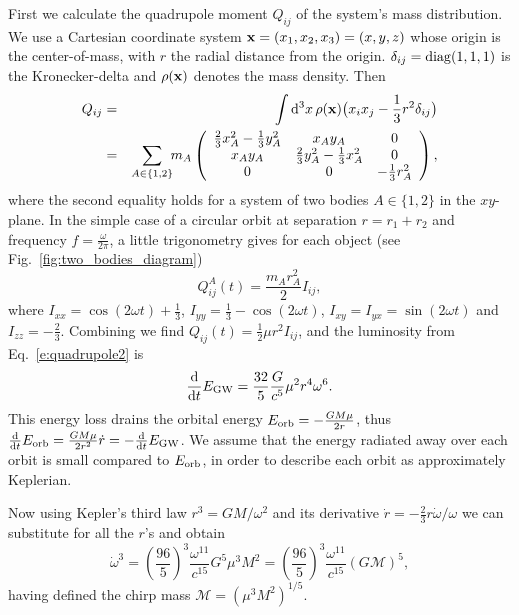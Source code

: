 \documentclass{andp2012}%
\def\w{\omega}
\def\D{{\rm d}}
\def\({\left(}
\def\){\right)}
\def\be{\begin{equation}}
\def\ee{\end{equation}}
\def\bea{\begin{eqnarray}}
\def\eea{\end{eqnarray}}
\newcommand{\refigure}[1]{Fig.~\ref{#1}}
\newcommand{\refeqn}[1]{Eq.\ \ref{#1}}
\def\Mc{\mathcal{M}}
\def\orb{_{\rm orb}}
\begin{document}
First we calculate the quadrupole moment $Q_{ij}$ of the system's
mass distribution.
We use a Cartesian coordinate system ${\bf x}=(x_1, x_2, x_3)=(x,y,z)$
whose origin is the center-of-mass, with $r$ the radial distance from the origin. 
$\delta_{ij} = \rm{diag} (1,1,1)$ is the Kronecker-delta and
$\rho({\bf x})$ denotes the mass density.
Then
\bea
Q_{ij} &=& \int \D^3 x  \, \rho({\bf x})  \bigl( x_i x_j - \frac{1}{3} r^2 \delta_{ij}
\bigr) \\
&=& \sum_{A\in\{1,2\}} \!\! m_A
\(
\begin{array}{ccc}
\frac{2}{3}x^2_A - \frac{1}{3}y^2_A 	&	 x_A y_A 										&	 0 \\
x_A y_A 										&	\frac{2}{3}y^2_A - \frac{1}{3}x^2_A  	&	 0 \\
0 												&	0  												&	 -\frac{1}{3}r^2_A
\end{array}
\)
,
\eea
where the second equality holds for a system of two bodies $A \in \{1,2\}$ in the $xy$-plane.
In the simple case of a circular orbit at separation $r=r_1+r_2$ and frequency $f=\frac{\w}{2\pi}$,
a little trigonometry gives for each object (see \refigure{fig:two_bodies_diagram})
\be
Q^A_{ij} (t) = \frac{m_A r_A^2}{2} I_{ij},
\ee
where
$I_{xx}=\cos(2\w t)+\frac{1}{3}$,
$I_{yy}=\frac{1}{3}-\cos(2\w t)$,
$I_{xy}=I_{yx}=\sin(2\w t)$
and $I_{zz} = -\frac{2}{3}$.
Combining we find $Q_{ij} (t) = \frac{1}{2} \mu r^2 I_{ij}$, 
and the \GW luminosity from \refeqn{e:quadrupole2} is
\begin{equation}
  \label{e:quadrupole3}
  \frac{\D}{\D t} E_{\rm GW}
  = \frac{32}{5} \frac{G}{c^5} \mu^2 r^4 \w^6.
\end{equation}
This energy loss drains the orbital energy
$E\orb = - \frac{G M \mu}{2r}$,
thus
$\frac{\D }{\D t} E\orb
= \frac{G M \mu}{2r^2} \dot{r}
= - \frac{\D}{\D t} E_{\rm GW}$.
We assume that
the energy radiated away over each orbit
is small compared to $E\orb$,
in order to describe each orbit as approximately Keplerian.

Now using Kepler's third law $r^3 = GM / \w^2$
and its derivative $\dot{r}=-\frac{2}{3} r\dot{\w}/\w$
we can substitute for all the $r$'s and obtain
\begin{equation}
  \label{e:Mc derivation}
  \dot{\w}^3 = \(\frac{96}{5}\)^3 \frac{\w^{11}}{c^{15}} G^5 \mu^3 M^2 = \(\frac{96}{5}\)^3 \frac{\w^{11}}{c^{15}} \(G \Mc\)^5,
\end{equation}
having defined the chirp mass $\Mc = \( \mu^3 M^2 \)^{1/5} $.
\end{document}
